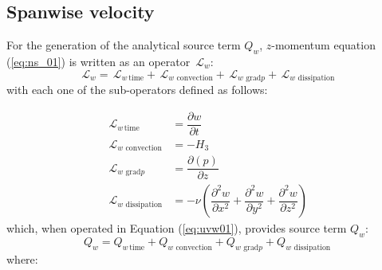 \documentclass[10pt]{article}
\newcommand{\Diff}[2] {\dfrac{\partial( #1)}{\partial #2}}
\newcommand{\diff}[2] {\dfrac{\partial #1}{\partial #2}}
\newcommand{\Lo}{\,\mathcal{L}}
\newcommand{\convection}{\,\text{convection}}
\newcommand{\gradp}{\,\text{grad}p}
\newcommand{\dissipation}{\,\text{dissipation}}
\begin{document}
\subsection{Spanwise velocity}
For the generation of the analytical source term $Q_w$, $z$-momentum equation (\ref{eq:ns_01}) is written as an operator $\Lo_w$:
 $$\Lo_w = \Lo_{w \, \text{time}}+\Lo_{w \, \convection}+\Lo_{w \, \gradp }+\Lo_{w \, \dissipation }$$
with each one of the sub-operators defined as follows:

\begin{equation}
 \begin{split}
\Lo_{w \, \text{time}}&= \diff{w}{t}  \\
\Lo_{w \, \convection}&= -H_3\\
\Lo_{w \, \gradp }&= \Diff{p}{z}\\
\Lo_{w \, \dissipation }&= - \nu\left(\diff{^2 w}{ x^2}+\diff{^2 w}{ y^2}+\diff{^2 w}{ z^2} \right)
 \end{split}
\end{equation}
%
which, when operated in Equation (\ref{eq:uvw01}),  provides source term $Q_{w}$:
\begin{equation*} 
Q_w = Q_{w \, \text{time}}+Q_{w \, \convection}+Q_{w \, \gradp }+Q_{w \, \dissipation }
\end{equation*}
where:
\end{document}
